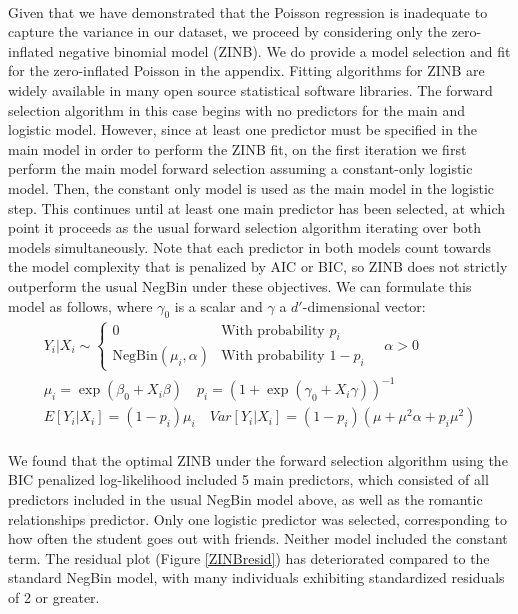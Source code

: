 \documentclass[12pt, titlepage]{article}
\begin{document}
	\paragraph{} Given that we have demonstrated that the Poisson regression is inadequate to capture the variance in our dataset, we proceed by considering only the zero-inflated negative binomial model (ZINB). We do provide a model selection and fit for the zero-inflated Poisson in the appendix. Fitting algorithms for ZINB are widely available in many open source statistical software libraries. The forward selection algorithm in this case begins with no predictors for the main and logistic model. However, since at least one predictor must be specified in the main model in order to perform the ZINB fit, on the first iteration we first perform the main model forward selection assuming a constant-only logistic model. Then, the constant only model is used as the main model in the logistic step. This continues until at least one main predictor has been selected, at which point it proceeds as the usual forward selection algorithm iterating over both models simultaneously. Note that each predictor in both models count towards the model complexity that is penalized by AIC or BIC, so ZINB does not strictly outperform the usual NegBin under these objectives. We can formulate this model as follows, where $\gamma_0$ is a scalar and $\gamma$ a $d'$-dimensional vector:
	\begin{gather*}
	Y_i|X_i \sim \begin{cases}
	0 & \text{With probability } p_i \\
	\text{NegBin}(\mu_i, \alpha)  & \text{With probability } 1-p_i
	\end{cases} \quad \alpha > 0
	\\
	\mu_i = \exp(\beta_0 + X_i\beta) \quad p_i = (1 + \exp(\gamma_0 + X_i\gamma))^{-1}  \\  
	E[Y_i|X_i] = (1-p_i)\mu_i \quad Var[Y_i|X_i] = (1-p_i)(\mu + \mu^2\alpha + p_i\mu^2)
	\end{gather*}
	
	\paragraph{} We found that the optimal ZINB under the forward selection algorithm using the BIC penalized log-likelihood included 5 main predictors, which consisted of all predictors included in the usual NegBin model above, as well as the romantic relationships predictor. Only one logistic predictor was selected, corresponding to how often the student goes out with friends. Neither model included the constant term. The residual plot (Figure \ref{ZINBresid}) has deteriorated compared to the standard NegBin model, with many individuals exhibiting standardized residuals of 2 or greater.
\end{document}
